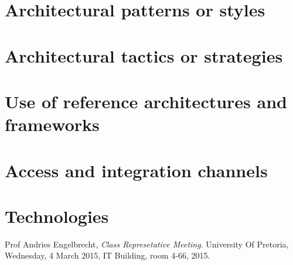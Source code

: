 \documentclass[a4paper,12pt]{report}
\begin{document}
\section{Architectural patterns or styles}
	
\section{Architectural tactics or strategies}
	
\section{Use of reference architectures and frameworks}
	
\section{Access and integration channels}
	
\section{Technologies}
	
\begin{thebibliography}{9}
  Prof Andries Engelbrecht,
  \emph{Class Represetative Meeting}.
	University Of Pretoria,
	Wednesday, 4 March 2015,
	IT Building, room 4-66,
  	2015.
\end{thebibliography}
\end{document}
